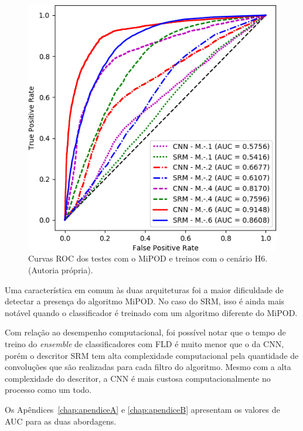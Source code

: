 \begin{figure}[!htb]
 \includegraphics[width=.8\textwidth]{dados/figuras/H6_M-_x.png}
 \caption{Curvas ROC dos testes com o MiPOD e treinos com o cenário H6. (Autoria própria).}
 \label{fig:ROC_M}
\end{figure}

Uma característica em comum às duas arquiteturas foi a maior dificuldade de detectar a presença do algoritmo MiPOD. No caso do SRM, isso é ainda mais notável quando o classificador é treinado com um algoritmo diferente do MiPOD.

Com relação ao desempenho computacional, foi possível notar que o tempo de treino do \textit{ensemble} de classificadores com FLD é muito menor que o da CNN, porém o descritor SRM tem alta complexidade computacional pela quantidade de convoluções que são realizadas para cada filtro do algoritmo. Mesmo com a alta complexidade do descritor, a CNN é mais custosa computacionalmente no processo como um todo. 

Os Apêndices~\ref{chap:apendiceA} e \ref{chap:apendiceB} apresentam os valores de AUC para as duas abordagens.

